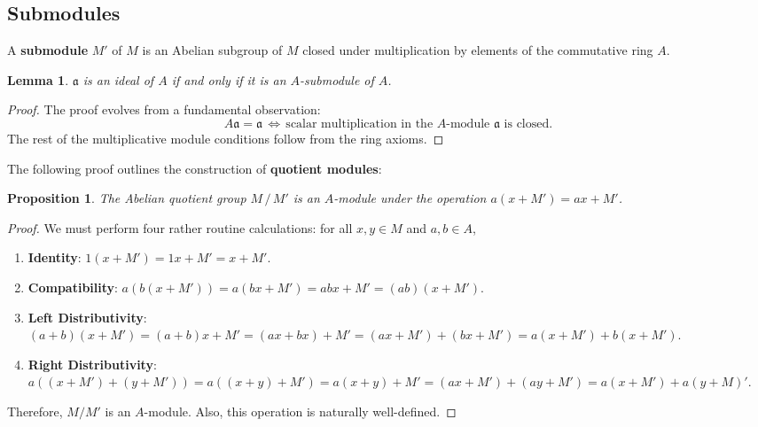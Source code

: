\documentclass[11pt]{article}
\newtheorem{lemma}{Lemma}
\newtheorem{proposition}{Proposition}
\begin{document}

\subsection{Submodules}

A \textbf{submodule} $M'$ of $M$ is an Abelian subgroup of $M$ closed under multiplication by elements of the commutative ring $A$. 

\begin{adjustwidth}{0.5cm}{}
  \begin{lemma}
    $\mathfrak{a}$ is an ideal of $A$ if and only if it is an $A$-submodule of $A$.
  \end{lemma}
  \begin{proof}
    The proof evolves from a fundamental observation:
    \[
      A \mathfrak{a} = \mathfrak{a} \, \iff \, \text{scalar multiplication in the $A$-module $\mathfrak{a}$ is closed}.
    \]
    The rest of the multiplicative module conditions follow from the ring axioms.
  \end{proof}
\end{adjustwidth}

The following proof outlines the construction of \textbf{quotient modules}:

\begin{adjustwidth}{0.5cm}{}
	\begin{proposition}
		The Abelian quotient group $M \, / \, M'$ is an $A$-module under the operation $a(x + M') = ax + M'$.
	\end{proposition}
	\begin{proof}
		We must perform four rather routine calculations: for all $x, y \in M$ and $a, b \in A$,
		\begin{enumerate}
      \item \textbf{Identity}: $1(x + M') = 1x + M' = x + M'$.
      \item \textbf{Compatibility}: $a(b(x + M')) = a(bx + M') = abx + M' = (ab)(x + M')$.
			\item \textbf{Left Distributivity}: $(a + b)(x + M') = (a + b)x + M' = (ax + bx) + M' = (ax + M') + (bx + M') = a(x + M') + b(x + M')$.
			\item \textbf{Right Distributivity}: $a((x + M') + (y + M')) = a((x + y) + M') = a(x + y) + M' = (ax + M') + (ay + M') = a(x + M') + a(y + M)'$.
		\end{enumerate}
		Therefore, $M / M'$ is an $A$-module. Also, this operation is naturally well-defined.
	\end{proof}
\end{adjustwidth}
\end{document}
